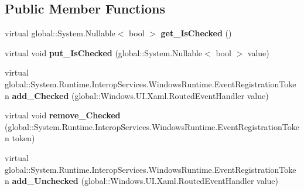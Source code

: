 \subsection*{Public Member Functions}
\begin{DoxyCompactItemize}
\item 
\mbox{\label{class_windows_1_1_u_i_1_1_xaml_1_1_controls_1_1_primitives_1_1_toggle_button_a202ddd3b271346dd0243b775278794c4}} 
virtual global\+::\+System.\+Nullable$<$ bool $>$ {\bfseries get\+\_\+\+Is\+Checked} ()
\item 
\mbox{\label{class_windows_1_1_u_i_1_1_xaml_1_1_controls_1_1_primitives_1_1_toggle_button_ac698bb4aa4d35725eb48fe2b35f4e0f8}} 
virtual void {\bfseries put\+\_\+\+Is\+Checked} (global\+::\+System.\+Nullable$<$ bool $>$ value)
\item 
\mbox{\label{class_windows_1_1_u_i_1_1_xaml_1_1_controls_1_1_primitives_1_1_toggle_button_a55fb908f07af09c5b2cbf2a26bb63503}} 
virtual global\+::\+System.\+Runtime.\+Interop\+Services.\+Windows\+Runtime.\+Event\+Registration\+Token {\bfseries add\+\_\+\+Checked} (global\+::\+Windows.\+U\+I.\+Xaml.\+Routed\+Event\+Handler value)
\item 
\mbox{\label{class_windows_1_1_u_i_1_1_xaml_1_1_controls_1_1_primitives_1_1_toggle_button_ab578caf9f875da4e2d95db0a1340c425}} 
virtual void {\bfseries remove\+\_\+\+Checked} (global\+::\+System.\+Runtime.\+Interop\+Services.\+Windows\+Runtime.\+Event\+Registration\+Token token)
\item 
\mbox{\label{class_windows_1_1_u_i_1_1_xaml_1_1_controls_1_1_primitives_1_1_toggle_button_a9bee5e40662d9de8fea1d16b5bb00d02}} 
virtual global\+::\+System.\+Runtime.\+Interop\+Services.\+Windows\+Runtime.\+Event\+Registration\+Token {\bfseries add\+\_\+\+Unchecked} (global\+::\+Windows.\+U\+I.\+Xaml.\+Routed\+Event\+Handler value)
\item 
\mbox{\label{class_windows_1_1_u_i_1_1_xaml_1_1_controls_1_1_primitives_1_1_toggle_button_ab20e6cc31c1ae3791da88ef65f9fffc3}} 

\end{DoxyCompactItemize}
